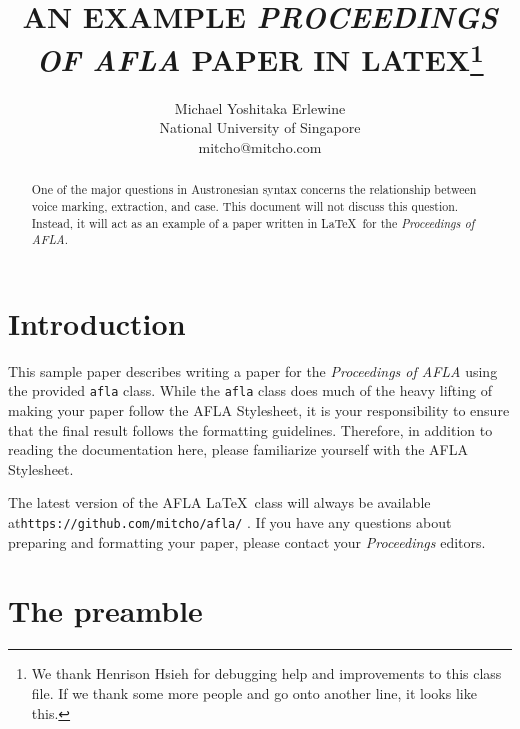 \documentclass{afla}
\begin{document}
\title{\MakeUppercase{An example \textit{Proceedings of AFLA} paper in LaTeX}\thanks{We thank Henrison Hsieh for debugging help and improvements to this class file. If we thank some more people and go onto another line, it looks like this.}}

\author{Michael Yoshitaka Erlewine\\
	National University of Singapore\\
	mitcho@mitcho.com}


\maketitle

\begin{abstract}
One of the major questions in Austronesian syntax concerns the relationship between voice marking, extraction, and case. This document will not discuss this question. Instead, it will act as an example of a paper written in \LaTeX\ for the \textit{Proceedings of AFLA}.
\end{abstract}

\section{Introduction}

This sample paper describes writing a paper for the \textit{Proceedings of AFLA} using the provided \verb`afla` class. While the \verb`afla` class does much of the heavy lifting of making your paper follow the AFLA Stylesheet, it is your responsibility to ensure that the final result follows the formatting guidelines. Therefore, in addition to reading the documentation here, please familiarize yourself with the AFLA Stylesheet.

The latest version of the AFLA \LaTeX\ class will always be available at\linebreak \verb`https://github.com/mitcho/afla/` . If you have any questions about preparing and formatting your paper, please contact your \textit{Proceedings} editors.

\section{The preamble}
\end{document}
